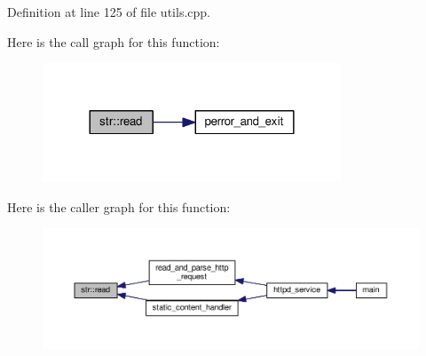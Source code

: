 Definition at line 125 of file utils.\+cpp.



Here is the call graph for this function\+:\nopagebreak
\begin{figure}[H]
\begin{center}
\leavevmode
\includegraphics[width=252pt]{namespacestr_a857ddd7aa296fcf860401e713155cece_cgraph}
\end{center}
\end{figure}




Here is the caller graph for this function\+:
\nopagebreak
\begin{figure}[H]
\begin{center}
\leavevmode
\includegraphics[width=350pt]{namespacestr_a857ddd7aa296fcf860401e713155cece_icgraph}
\end{center}
\end{figure}


